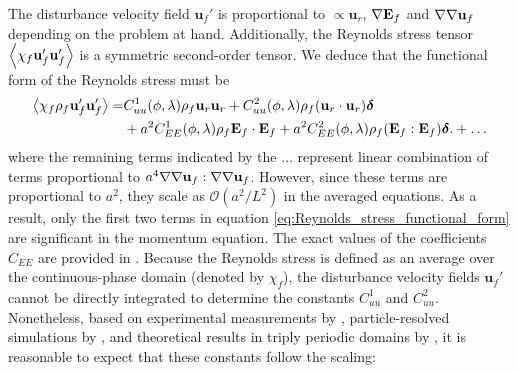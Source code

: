 The disturbance velocity field $\textbf{u}_f'$ is proportional to $\propto \textbf{u}_r$, $\mathbf{\nabla}\textbf{E}_f$ and $\mathbf{\nabla}\mathbf{\nabla} \textbf{u}_f$ depending on the problem at hand.
Additionally, the Reynolds stress tensor $\left<\chi_f \textbf{u}_f'\textbf{u}_f'\right>$ is a symmetric second-order tensor. 
We deduce that the functional form of the Reynolds stress must be 
\begin{align}
    \avg{\chi_f \rho_f \textbf{u}_f' \textbf{u}_f'}
    =&
    C_{uu}^1(\phi,\lambda) \rho_f \textbf{u}_{r} \textbf{u}_{r}
    + C_{uu}^2(\phi,\lambda) \rho_f (\textbf{u}_{r}\cdot  \textbf{u}_{r})\bm\delta\\
    &+a^2 C_{EE}^1(\phi,\lambda) \rho_f\textbf{E}_f\cdot \textbf{E}_f 
    +  a^2 C_{EE}^2(\phi,\lambda) \rho_f (\textbf{E}_f : \textbf{E}_f)\bm\delta.
    + \ldots
    \label{eq:Reynolds_stress_functional_form}
\end{align}
where the remaining terms indicated by the $\ldots$ represent linear combination of terms proportional to $a^4\mathbf{\nabla}\mathbf{\nabla} \textbf{u}_f:\mathbf{\nabla}\mathbf{\nabla} \textbf{u}_f$. 
However, since these terms are proportional to $a^2$, they scale as $\mathcal{O}(a^2/L^2)$ in the averaged equations. 
As a result, only the first two terms in equation \ref{eq:Reynolds_stress_functional_form} are significant in the momentum equation.
The exact values of the coefficients $C_{EE}$ are provided in \citet{raja2010inertial}. 
Because the Reynolds stress is defined as an average over the continuous-phase domain (denoted by $\chi_f$), the disturbance velocity fields $\textbf{u}_f'$ cannot be directly integrated to determine the constants $C_{uu}^1$ and $C_{uu}^2$. 
Nonetheless, based on experimental measurements by \citet{cartellier2009induced}, particle-resolved simulations by \citet{fintzi2025}, and theoretical results in triply periodic domains by \citet{hill2001first}, it is reasonable to expect that these constants follow the scaling:

